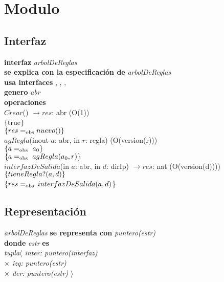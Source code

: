\section*{Modulo }

\subsection*{Interfaz}
\textbf{interfaz} \textit{arbolDeReglas}\\
\textbf{se explica con la especificaci\'on de} \textit{arbolDeReglas}\\
\textbf{usa interfaces} , , ,\\
\textbf{genero} \textit{abr}\\

\textbf{operaciones}\\

$Crear$() $\longrightarrow res$: abr \hfill (O(1)) \\
$\{$true$\}$\\
$\{{res} =_{\mathrm{obs}} nuevo()\}$\\

$agRegla$(inout $a$: abr, in $r$: regla) \hfill (O(version(r))) \\
$\{\sombreritoWide{a} \igobs\ a_0\}$\\
$\{\sombreritoWide{a} \igobs\ agRegla(a_0,\sombreritoWide{r})\}$\\

$interfazDeSalida$(in $a$: abr, in $d$: dirIp) $\longrightarrow res$: nat \hfill (O(version(d)))) \\
$\{tieneRegla?({a},{d})\}$\\
$\{{res}=_{\mathrm{obs}}$ $interfazDeSalida({a},{d})$\}\\


\subsection*{Representaci\'on}
\textit{arbolDeReglas} \textbf{se representa con} \textit{puntero(estr)}\\
\textbf{donde} \textit{estr} \textbf{es}\\
\textit{tupla$\langle$ inter: puntero(interfaz)\\
\hspace*{1.1cm}$\times$ izq: puntero(estr)\\
\hspace*{1.1cm}$\times$ der: puntero(estr) $\rangle$}
\vspace{33pt}


